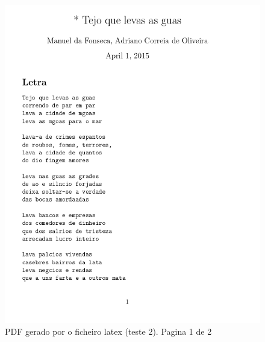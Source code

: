 \begin{figure}
\centering
\includegraphics[width=15cm]{anexos/2-5/2-5-b-img.png}
\caption{PDF gerado por o ficheiro latex (teste 2). Pagina 1 de 2}
\label{fig::anex-music-test-img02}
\end{figure}

